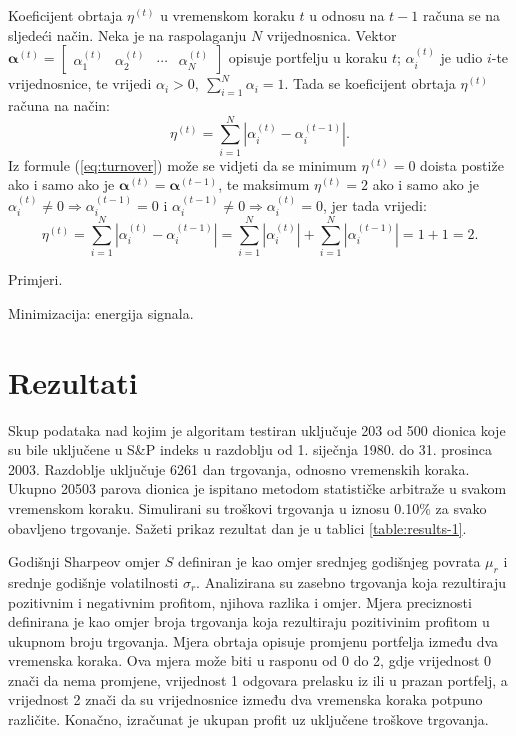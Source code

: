 \documentclass[lmodern, utf8, diplomski, numeric]{fer}
\newcommand{\matr}[1]{\mathbold{#1}}
\begin{document}
  Koeficijent obrtaja $\eta^{(t)}$ u vremenskom koraku $t$ u odnosu na $t-1$ računa se na sljedeći način.
  Neka je na raspolaganju $N$ vrijednosnica.
  Vektor $\matr{\alpha}^{(t)} = \begin{bmatrix} \alpha_1^{(t)} & \alpha_2^{(t)} & \cdots & \alpha_N^{(t)} \end{bmatrix}$ opisuje portfelju u koraku $t$; $\alpha_i^{(t)}$ je udio $i$-te vrijednosnice, te vrijedi $\alpha_i > 0,\ \sum_{i=1}^{N} \alpha_i = 1$.
  Tada se koeficijent obrtaja $\eta^{(t)}$ računa na način:
  \begin{equation}
  \label{eq:turnover}
  \eta^{(t)} = \sum_{i=1}^{N} \left\lvert \alpha_i^{(t)} - \alpha_i^{(t-1)} \right\rvert.
  \end{equation}
  Iz formule (\ref{eq:turnover}) može se vidjeti da se minimum $\eta^{(t)} = 0$ doista postiže ako i samo ako je $\matr{\alpha}^{(t)} = \matr{\alpha}^{(t-1)}$,
  te maksimum $\eta^{(t)} = 2$ ako i samo ako je $\alpha_i^{(t)} \ne 0 \Rightarrow \alpha_i^{(t - 1)} = 0$ i $\alpha_i^{(t - 1)} \ne 0 \Rightarrow \alpha_i^{(t)} = 0$, jer tada vrijedi: 
  \begin{equation*}
  \eta^{(t)} = \sum_{i=1}^{N} \left\lvert \alpha_i^{(t)} - \alpha_i^{(t-1)} \right\rvert = \sum_{i=1}^{N} \left\lvert \alpha_i^{(t)}\right\rvert + \sum_{i=1}^N \left \lvert\alpha_i^{(t-1)} \right\rvert = 1 + 1 = 2.
  \end{equation*}
  
  Primjeri.
  
  Minimizacija: energija signala.
  
  \chapter{Rezultati}
  Skup podataka nad kojim je algoritam testiran uključuje 203 od 500 dionica koje su bile uključene u S\&P indeks u razdoblju od 1. siječnja 1980. do 31. prosinca 2003.
  Razdoblje uključuje 6261 dan trgovanja, odnosno vremenskih koraka.
  Ukupno 20503 parova dionica je ispitano metodom statističke arbitraže u svakom vremenskom koraku.
  Simulirani su troškovi trgovanja u iznosu 0.10\% za svako obavljeno trgovanje.
  Sažeti prikaz rezultat dan je u tablici \ref{table:results-1}.
  
  Godišnji Sharpeov omjer $S$ definiran je kao omjer srednjeg godišnjeg povrata $\mu_r$ i srednje godišnje volatilnosti $\sigma_r$.
  Analizirana su zasebno trgovanja koja rezultiraju pozitivnim i negativnim profitom, njihova razlika i omjer.
  Mjera preciznosti definirana je kao omjer broja trgovanja koja rezultiraju pozitivinim profitom u ukupnom broju trgovanja.
  Mjera obrtaja  opisuje promjenu portfelja između dva vremenska koraka.
  Ova mjera može biti u rasponu od 0 do 2, gdje vrijednost 0 znači da nema promjene, vrijednost 1 odgovara prelasku iz ili u prazan portfelj, a vrijednost 2 znači da su vrijednosnice između dva vremenska koraka potpuno različite.
  Konačno, izračunat je ukupan profit uz uključene troškove trgovanja.
  
\end{document}
